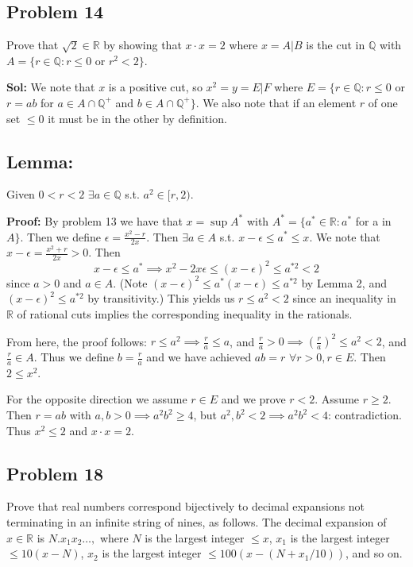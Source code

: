 \documentclass{amsart}
\begin{document}
\newpage
\subsection*{Problem 14}
\noindent Prove that $\sqrt{2}\in\mathbb{R}$ by showing that $x\cdot x=2$ where $x=A|B$ is the cut
in $\mathbb{Q}$ with $A=\{r \in \mathbb{Q}: r\leq 0 $ or $r^2<2\}$.

\medskip
\noindent \textbf{Sol:} We note that $x$ is a positive cut, so $x^2=y=E|F$ where $E= \{r\in\mathbb{Q}: r\leq 0$ or $r=ab$ for $a\in A\cap\mathbb{Q}^+$
and $b\in A\cap\mathbb{Q}^+\}$. We also note that if an element $r$ of one set $\leq 0$ it must be in the other by definition.

\subsection*{Lemma:} Given $0<r<2$ $\exists a\in\mathbb{Q}$ s.t. $a^2\in[r, 2)$.

\noindent \textbf{Proof:} By problem 13 we have that $x=\sup A^*$ with $A^* =\{a^*\in\mathbb{R}: a^*$ for a in $A\}$. Then we define $\epsilon=
\frac{x^2-r}{2x}$. Then $\exists a\in A$ s.t. $x-\epsilon\leq a^*\leq x$. We note that $x-\epsilon = \frac{x^2+r}{2x}>0$. Then 
$$x-\epsilon\leq a^*\implies x^2-2x\epsilon\leq (x-\epsilon)^2\leq a^{*2} < 2$$ since $a > 0$ and $a\in A$. (Note $(x-\epsilon)^2\leq a^*(x-\epsilon)\leq a^{*2}$
by Lemma 2, and$(x-\epsilon)^2\leq a^{*2}$ by transitivity.) 
This yields us $r\leq a^2<2$ since an inequality in $\mathbb{R}$ of rational cuts implies the corresponding inequality in the rationals. 

From here, the proof follows: $r\leq a^2\implies \frac{r}{a}\leq a$, and $\frac{r}{a}>0\implies (\frac{r}{a})^2\leq a^2 <2$, and $\frac{r}{a}
\in A$. Thus we define $b=\frac{r}{a}$ and we have achieved $ab=r$ $\forall r>0, r\in E$. Then $2\leq x^2$. 

\medskip
\noindent For the opposite direction we assume $r\in E$ and we prove $r < 2$. Assume $r\geq 2$. Then $r=ab$ with $a,b>0\implies a^2b^2\geq 4$, 
but $a^2, b^2<2\implies a^2b^2<4$: contradiction. Thus $x^2\leq 2$ and $x\cdot x = 2$. 





\newpage
\subsection*{Problem 18}
\noindent Prove that real numbers correspond bijectively to decimal expansions not terminating in 
an infinite string of nines, as follows. The decimal expansion of $x\in\mathbb{R}$ is $N.x_1x_2\dots,$ 
where $N$ is the largest integer $\leq x$, $x_1$ is the largest integer $\leq 10(x-N)$, $x_2$ is the
largest integer $\leq 100(x-(N+x_1/10))$, and so on.
\end{document}
